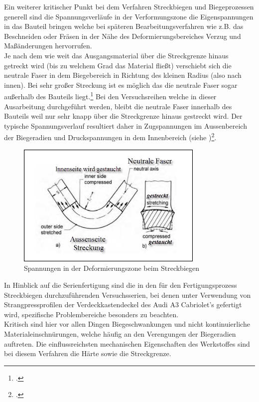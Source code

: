 \documentclass[12pt,a4paper,parskip]{scrartcl}
\begin{document}
Ein weiterer kritischer Punkt bei dem Verfahren Streckbiegen und Biegeprozessen generell sind die Spannungsverläufe in der Verformungszone die Eigenspannungen in das Bauteil bringen welche bei späteren Bearbeitungsverfahren wie z.B. das Beschneiden oder Fräsen in der Nähe des Deformierungsbereiches Verzug und Maßänderungen hervorrufen.\\ Je nach dem wie weit das Ausgangsmaterial über die Streckgrenze hinaus getreckt wird (bis zu welchem Grad das Material fließt) verschiebt sich die neutrale Faser in dem Biegebereich in Richtung des kleinen Radius (also nach innen). Bei sehr großer Streckung ist es möglich das die neutrale Faser sogar außerhalb des Bauteils liegt.\footcite[Vgl.][374]{fu} Bei den Versuchsreihen welche in dieser Ausarbeitung durchgeführt werden, bleibt die neutrale Faser innerhalb des Bauteils weil nur sehr knapp über die Streckgrenze hinaus gestreckt wird. Der typische Spannungsverlauf resultiert daher in Zugspannungen im Aussenbereich der Biegeradien und Druckspannungen in dem Innenbereich (siehe )\footcite[Vgl.][195]{tsch}.

\begin{figure}[hbtp]
\centering
\includegraphics[width=0.8\textwidth]{neutralefaser}
\caption{Spannungen in der Deformierungszone beim Streckbiegen}
\label{fig:neutralefaser}
\end{figure}
In Hinblick auf die Serienfertigung sind die in den für den Fertigungsprozess  Streckbiegen durchzuführenden Versuchsserien, bei denen unter Verwendung von Strangpressprofilen der Verdeckkastendeckel des Audi A3 Cabriolet's gefertigt wird, spezifische Problembereiche besonders zu beachten.\\
Kritisch sind hier vor allen Dingen Biegeschwankungen und nicht kontinuierliche Materialeinschnürungen,  welche häufig an den Verengungen der Biegeradien auftreten. Die einflussreichsten mechanischen Eigenschaften des Werkstoffes sind bei diesem Verfahren die Härte sowie die Streckgrenze.
\end{document}
